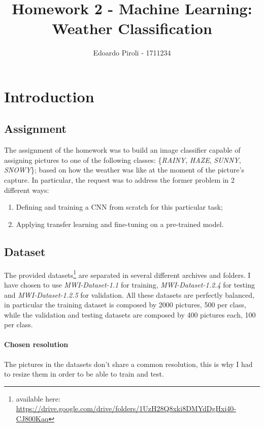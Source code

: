 \documentclass[a4paper]{article}
\title{Homework 2 - Machine Learning: Weather Classification}
\author{Edoardo Piroli - 1711234}
\begin{document}
\maketitle
\thispagestyle{empty}

\newpage
\tableofcontents
\thispagestyle{empty}
\newpage


\section{Introduction}
\subsection{Assignment}
The assignment of the homework was to build an image classifier capable of assigning pictures to one of the following classes: \{\textit{RAINY}, \textit{HAZE}, \textit{SUNNY}, \textit{SNOWY}\}; based on how the weather was like at the moment of the picture's capture. In particular, the request was to address the former problem in 2 different ways: 
\begin{enumerate}
\item Defining and training a CNN from scratch for this particular task;
\item Applying transfer learning and fine-tuning on a pre-trained model.
\end{enumerate}
\subsection{Dataset}
The provided datasets\footnote{available here: \href{https://drive.google.com/drive/folders/1UzH28Q8xki8_DMYdDgHxi40-CJ800Kaq}{https://drive.google.com/drive/folders/1UzH28Q8xki8\textunderscore DMYdDgHxi40-CJ800Kaq}} are separated in several different archives and folders. I have chosen to use \textit{MWI-Dataset-1.1} for training, \textit{MWI-Dataset-1.2.4} for testing and \textit{MWI-Dataset-1.2.5} for validation. All these datasets are perfectly balanced, in particular the training dataset is composed by 2000 pictures, 500 per class, while the validation and testing datasets are composed by 400 pictures each, 100 per class. 
\paragraph{Chosen resolution}
The pictures in the datasets don't share a common resolution, this is why I had to resize them in order to be able to train and test. 
\end{document}
